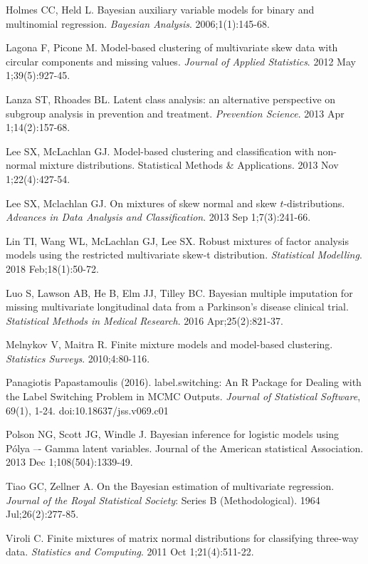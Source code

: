 \documentclass[useAMS,referee]{biom}
\begin{document}
\begin{thebibliography}{}
\bibitem{ } Holmes CC, Held L. Bayesian auxiliary variable models for binary and multinomial regression. \textit{Bayesian Analysis}. 2006;1(1):145-68.

\bibitem{ } Lagona F, Picone M. Model-based clustering of multivariate skew data with circular components and missing values. \textit{Journal of Applied Statistics}. 2012 May 1;39(5):927-45.

\bibitem{ } Lanza ST, Rhoades BL. Latent class analysis: an alternative perspective on subgroup analysis in prevention and treatment. \textit{Prevention Science}. 2013 Apr 1;14(2):157-68.

\bibitem{ } Lee SX, McLachlan GJ. Model-based clustering and classification with non-normal mixture distributions. Statistical Methods \& Applications. 2013 Nov 1;22(4):427-54.

\bibitem{ } Lee SX, Mclachlan GJ. On mixtures of skew normal and skew $t$-distributions. \textit{Advances in Data Analysis and Classification}. 2013 Sep 1;7(3):241-66.

\bibitem{ } Lin TI, Wang WL, McLachlan GJ, Lee SX. Robust mixtures of factor analysis models using the restricted multivariate skew-t distribution. \textit{Statistical Modelling}. 2018 Feb;18(1):50-72.

\bibitem{ } Luo S, Lawson AB, He B, Elm JJ, Tilley BC. Bayesian multiple imputation for missing multivariate longitudinal data from a Parkinson's disease clinical trial. \textit{Statistical Methods in Medical Research}. 2016 Apr;25(2):821-37.

\bibitem{ } Melnykov V, Maitra R. Finite mixture models and model-based clustering. \textit{Statistics Surveys}. 2010;4:80-116.

\bibitem{ } Panagiotis Papastamoulis (2016). label.switching: An R Package for Dealing with the Label Switching Problem in MCMC Outputs. \textit{Journal of Statistical Software}, 69(1), 1-24. doi:10.18637/jss.v069.c01

\bibitem{ } Polson NG, Scott JG, Windle J. Bayesian inference for logistic models using P\'olya –- Gamma latent variables. Journal of the American statistical Association. 2013 Dec 1;108(504):1339-49.

\bibitem{ } Tiao GC, Zellner A. On the Bayesian estimation of multivariate regression. \textit{Journal of the Royal Statistical Society}: Series B (Methodological). 1964 Jul;26(2):277-85.

\bibitem{ } Viroli C. Finite mixtures of matrix normal distributions for classifying three-way data. \textit{Statistics and Computing}. 2011 Oct 1;21(4):511-22.


\end{thebibliography}
\end{document}
